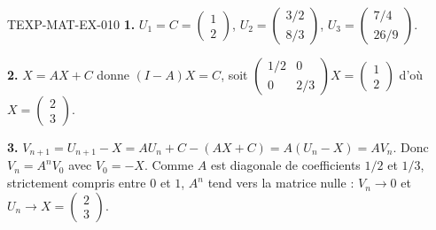 \begin{corrige}{TEXP-MAT-EX-010}
\textbf{1.} $U_1=C=\begin{pmatrix}1\\2\end{pmatrix}$,
$U_2=\begin{pmatrix}3/2\\8/3\end{pmatrix}$,
$U_3=\begin{pmatrix}7/4\\26/9\end{pmatrix}$.

\textbf{2.} $X=AX+C$ donne $(I-A)X=C$, soit
$\begin{pmatrix}1/2&0\\0&2/3\end{pmatrix}X=\begin{pmatrix}1\\2\end{pmatrix}$
d'où $X=\begin{pmatrix}2\\3\end{pmatrix}$.

\textbf{3.} $V_{n+1}=U_{n+1}-X=AU_n+C-(AX+C)=A(U_n-X)=AV_n$. Donc
$V_n=A^nV_0$ avec $V_0=-X$. Comme $A$ est diagonale de coefficients
$1/2$ et $1/3$, strictement compris entre $0$ et $1$, $A^n$ tend vers la
matrice nulle : $V_n\to0$ et $U_n\to X=\begin{pmatrix}2\\3\end{pmatrix}$.
\end{corrige}
